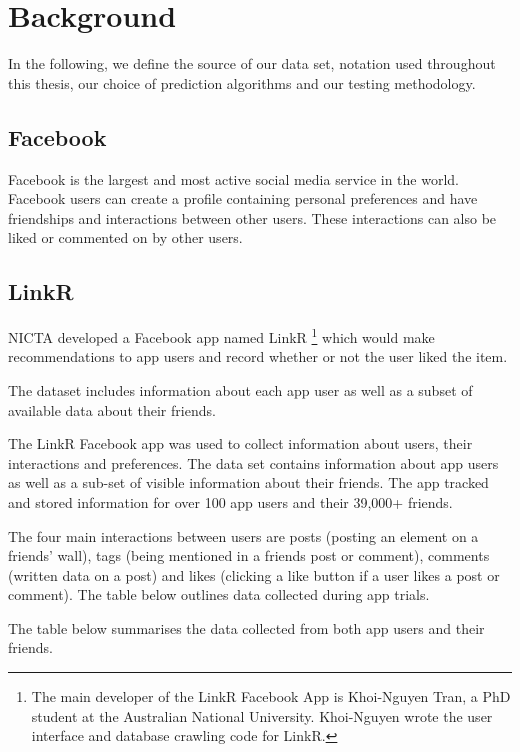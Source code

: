 
\chapter{Background}
\label{cha:back}

In the following, we define the source of our data set, notation used throughout this thesis, our choice of prediction algorithms and 
our testing methodology.

\section{Facebook}
\label{sec:data}

Facebook is the largest and most active social media service in the world. Facebook users can create a profile containing personal preferences 
and have friendships and interactions between other users. These interactions can also be liked or commented on by other users.

\section{LinkR}
\label{sec:linkr}

NICTA developed a Facebook app named LinkR \footnote{The main developer of the LinkR
Facebook App is Khoi-Nguyen Tran, a PhD student at the Australian
National University.  Khoi-Nguyen wrote the user interface and database
crawling code for LinkR.} 
which would make recommendations to app users and record whether or not the user liked the item.

The dataset includes information about each app user as well as a subset of available data about their friends.

The LinkR Facebook app was used to collect information about users, their interactions and preferences. The data set contains information about app users as 
well as a sub-set of visible information about their friends. The app tracked and stored information for over 100 app users and their 39,000+ friends.

The four main interactions between users are posts (posting an element on a friends' wall), tags (being mentioned in a friends post or comment), 
comments (written data on a post) and likes (clicking a like button if a user likes a post or comment). The table below outlines data collected during 
app trials.
 
The table below summarises the data collected from both app users and their friends.

